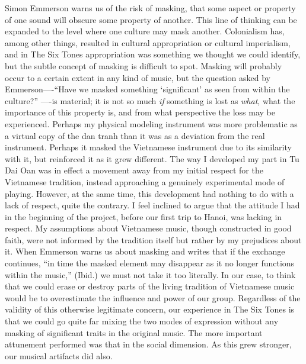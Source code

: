 \documentclass[a4paper]{article}
\begin{document}
Simon Emmerson warns us of the risk of masking, that some aspect or property of one sound will obscure some property of another. This line of thinking can be expanded to the level where one culture may mask another. Colonialism has, among other things, resulted in cultural appropriation or cultural imperialism, and in The Six Tones appropriation was something we thought we could identify, but the subtle concept of masking is difficult to spot. Masking will probably occur to a certain extent in any kind of music, but the question asked by Emmerson—-``Have we masked something `significant' as seen from within the culture?'' \autocite[2]{emmerson06}—-is material; it is not so much \emph{if} something is lost as \emph{what}, what the importance of this property is, and from what perspective the loss may be experienced. Perhaps my physical modeling instrument was more problematic as a virtual copy of the dan tranh than it was as a deviation from the real instrument. Perhaps it masked the Vietnamese instrument due to its similarity with it, but reinforced it as it grew different. The way I developed my part in Tu Dai Oan was in effect a movement away from my initial respect for the Vietnamese tradition, instead approaching a genuinely experimental mode of playing. However, at the same time, this development had nothing to do with a lack of respect, quite the contrary. I feel inclined to argue that the attitude I had in the beginning of the project, before our first trip to Hanoi, was lacking in respect. My assumptions about Vietnamese music, though constructed in good faith, were not informed by the tradition itself but rather by my prejudices about it. When Emmerson warns us about masking and writes that if the exchange continues, ``in time the masked element may disappear as it no longer functions within the music,'' (Ibid.) we must not take it too literally. In our case, to think that we could erase or destroy parts of the living tradition of Vietnamese music would be to overestimate the influence and power of our group. Regardless of the validity of this otherwise legitimate concern, our experience in The Six Tones is that we could go quite far mixing the two modes of expression without any masking of significant traits in the original music. The more important attunement performed was that in the social dimension. As this grew stronger, our musical artifacts did also.
\end{document}

